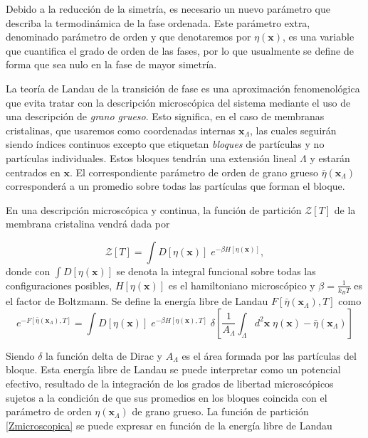 Debido a la reducción de la simetría, es necesario un nuevo parámetro que 
describa la termodinámica de la fase ordenada. Este parámetro
extra, denominado parámetro de orden y que denotaremos por $\eta(\mathbf{x})$,
es una 
variable que cuantifica el grado de orden de
las fases, por lo que usualmente se define de forma que sea nulo en la fase
de mayor simetría.

\begin{figure}[h]
\centering
{}
\quad
{}
\end{figure}

La teoría de Landau de la transición de fase es una aproximación
fenomenológica que evita tratar con la descripción microscópica del sistema
mediante el uso de una descripción de \textit{grano grueso}. Esto significa,
en el caso de membranas cristalinas, que usaremos como coordenadas internas
$\mathbf{x}_{\Lambda}$, las cuales seguirán  siendo índices continuos excepto
que etiquetan \textit{bloques} de partículas y no partículas
individuales. Estos bloques tendrán una extensión lineal $\Lambda$ y estarán
centrados en $\mathbf{x}$. El correspondiente parámetro de orden de grano
grueso $\bar{\eta}(\mathbf{x}_{\Lambda})$ corresponderá a un promedio sobre
todas las partículas que forman el bloque.

En una descripción microscópica y continua, la función de partición
$\mathcal{Z}[T]$ de la membrana cristalina vendrá dada por

\begin{equation}\label{Zmicroscopica}
\mathcal{Z}[T]=\int D[\eta(\mathbf{x})]\; e^{-\beta H[\eta(\mathbf{x})]},
\end{equation}
donde con $\int D[\eta(\mathbf{x})]$ se denota la integral funcional sobre
todas las configuraciones posibles, $H[\eta(\mathbf{x})]$ es el hamiltoniano
microscópico y $\beta=\frac{1}{k_BT}$ es el factor de Boltzmann. Se define la
energía libre de Landau 
$F[\bar{\eta}(\mathbf{x}_{\Lambda}),T]$ como 
\begin{equation*}
e^{-F[\bar{\eta}(\mathbf{x}_{\Lambda}),T]}=\int D[\eta(\mathbf{x})]\; e^{-\beta
  H[\eta(\mathbf{x}),T]}
  \;\delta\left[\frac{1}{A_{\Lambda}}\int_{\Lambda} d^2\mathbf{x}\; \eta(\mathbf{x})-\bar{\eta}(\mathbf{x}_{\Lambda})\right]
\end{equation*}

Siendo $\delta$ la función delta de Dirac y $A_{\Lambda}$ es el área
formada por las partículas del bloque. Esta energía libre de Landau se puede
interpretar como un potencial efectivo, resultado de la integración de los
grados de libertad microscópicos sujetos a la condición de que sus promedios
en los  bloques coincida con el parámetro de orden
$\eta(\mathbf{x}_{\Lambda})$ de grano grueso. La función de partición
\eqref{Zmicroscopica} se puede expresar en función de la energía libre de
Landau

